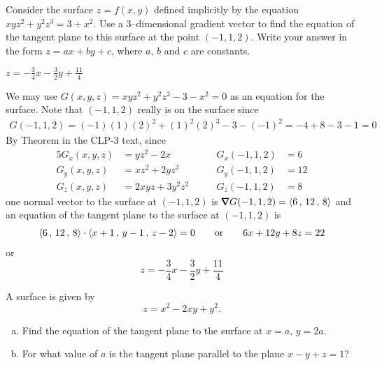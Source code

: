 \begin{question}[M200 2005D] %
Consider the surface $z = f(x,y)$ defined implicitly by the equation 
$xyz^2 + y^2 z^3 = 3 + x^2$. Use a 3--dimensional gradient vector 
to find the equation of the tangent plane to this surface at the point
$(-1, 1, 2)$. Write your answer in the form $z = ax + by + c$, where 
$a$, $b$ and $c$ are constants.
\end{question}

%

\begin{answer}
$z = -\frac{3}{4} x- \frac{3}{2} y + \frac{11}{4}$
\end{answer}

\begin{solution}
We may use $G(x,y,z) = xyz^2 + y^2 z^3 - 3 - x^2 = 0$ as an equation for
the surface.  Note that $(-1,1,2)$ really is on the surface since
\begin{align*}
G(-1,1,2) = (-1)(1)(2)^2 + (1)^2 (2)^3 - 3 - (-1)^2 
          = -4 + 8 - 3 - 1
          =0
\end{align*}
By Theorem  in the CLP-3 text, since
\begin{alignat*}{5}
G_x(x,y,z)&=yz^2 -2x \qquad & 
    G_x(-1,1,2)&=6  \\
G_y(x,y,z)&=xz^2 +2yz^3 \qquad & 
    G_y(-1,1,2)&=12  \\
G_z(x,y,z)&=2xyz+3y^2z^2 \qquad & 
    G_z(-1,1,2)&=8  
\end{alignat*}
one normal vector to the surface at $(-1,1,2)$ is 
 $\vnabla G(-1,1,2) = \llt 6\,,\,12\,,\,8\rgt$ and an equation
of the tangent plane to the surface at $(-1,1,2)$ is
\begin{align*}
\left< 6\,,\,12\,,\,8\right> \cdot
     \left< x+1\,,\,y-1\,,\,z-2\right> = 0\qquad\text{or}\qquad
6x+12 y+ 8z = 22
\end{align*}
or
\begin{equation*}
z = -\frac{3}{4} x- \frac{3}{2} y +\frac{11}{4}
\end{equation*}
\end{solution}

\begin{question}[M200 2008D] %
A surface is given by
\begin{equation*}
z = x^2 - 2xy + y^2 .
\end{equation*}

\begin{enumerate}[(a)]
\item
Find the equation of the tangent plane to the surface at $x = a$, $y = 2a$.

\item 
For what value of $a$ is the tangent plane parallel to the plane 
$x - y + z = 1$?
\end{enumerate}
\end{question}

